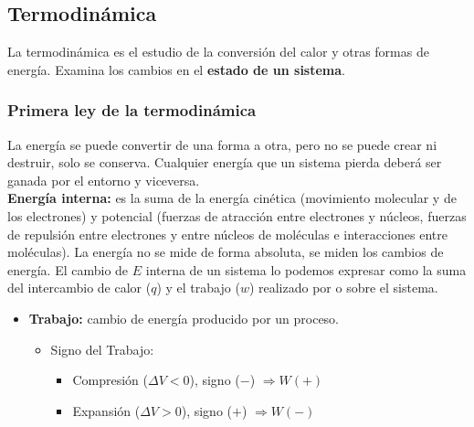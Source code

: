     \subsection{Termodinámica}
        \sangria{} La termodinámica es el estudio de la conversión del calor y otras formas de energía. Examina los cambios en el \textbf{estado de un sistema}.
        \subsubsection{Primera ley de la termodinámica}
            \sangria{} La energía se puede convertir de una forma a otra, pero no se puede crear ni destruir, solo se conserva. Cualquier energía que un sistema pierda deberá ser ganada por el entorno y viceversa. \\
            \textbf{Energía interna:} es la suma de la energía cinética (movimiento molecular y de los electrones) y potencial (fuerzas de atracción entre electrones y núcleos, fuerzas de repulsión entre electrones y entre núcleos de moléculas e interacciones entre moléculas).
            La energía no se mide de forma absoluta, se miden los cambios de energía.
            \sangria{} El cambio de $E$ interna de un sistema lo podemos expresar como la suma del intercambio de calor ($q$) y el trabajo ($w$) realizado por o sobre el sistema.
            \begin{itemize}
                \item \textbf{Trabajo:} cambio de energía producido por un proceso.
                \begin{itemize}
                    \item Signo del Trabajo:
                        \begin{itemize}
                            \item Compresión ($\Delta V < 0$), signo ($-$) $\Rightarrow W (+)$
                            \item Expansión ($\Delta V > 0$), signo ($+$) $\Rightarrow W(-)$
                        \end{itemize}
                \end{itemize}
            \end{itemize}
